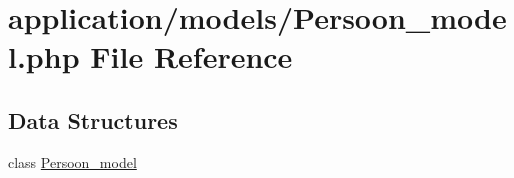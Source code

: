 \hypertarget{_persoon__model_8php}{}\section{application/models/\+Persoon\+\_\+model.php File Reference}
\label{_persoon__model_8php}
\subsection*{Data Structures}
\begin{DoxyCompactItemize}
\item 
class \mbox{\hyperlink{class_persoon__model}{Persoon\+\_\+model}}
\end{DoxyCompactItemize}
